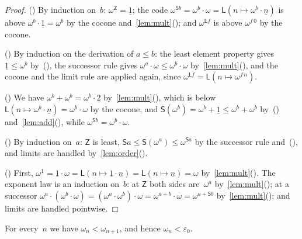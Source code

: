 \documentclass[11pt]{amsart}
\makeatletter
\newcommand{\bZ}{\mathsf{Z}}
\newcommand{\bS}{\mathsf{S}}
\newcommand{\bL}{\mathsf{L}}
\newcommand{\bplus}{\mathbin{+}}
\newcommand{\btimes}{\mathbin{\cdot}}
\newcommand{\num}[1]{\underline{#1}}          %
\newcommand{\eps}{\varepsilon_{0}}
\newcommand{\tower}[1]{\omega_{#1}}           %
\newif\ifagdarefs
\newcommand{\AgdaRefs}[1]{\ifagdarefs{\footnotesize\color{agdablue}(#1)}\else\unskip\fi}
\newcommand{\Agda}[2]{{\footnotesize\color{agdablue}\textsf{#1}%
  \ifblank{#2}{}{\texttt{.}\allowbreak\texttt{#2}}}}
\let\ttt@plain\texttt
\renewcommand{\texttt}[1]{{\footnotesize\color{agdablue}\ttt@plain{#1}}}
\theoremstyle{plain}
\theoremstyle{definition}
\makeatother
\begin{document}
\begin{proof}
() By induction on~$b$: $\omega^{\bZ} = \num 1$;
the code $\omega^{\bS b} = \omega^{b} \btimes \omega
= \bL(n \mapsto \omega^{b} \btimes \num n)$ is above
$\omega^{b} \btimes \num 1 = \omega^{b}$ by the cocone
and~\cref{lem:mult}(); and $\omega^{\bL f}$ is
above $\omega^{f\,0}$ by the cocone.

() By induction on the derivation of
$a \le b$: the least element property gives
$\num 1 \le \omega^{b}$ by~(), the successor
rule gives $\omega^{a} \btimes \omega \le \omega^{b} \btimes \omega$
by~\cref{lem:mult}(), and the cocone and the
limit rule are applied again, since
$\omega^{\bL f} = \bL(n \mapsto \omega^{f\,n})$.

() We have
$\omega^{b} \bplus \omega^{b} = \omega^{b} \btimes \num 2$
by~\cref{lem:mult}(), which is
below $\bL(n \mapsto \omega^{b} \btimes \num n) = \omega^{b} \btimes
\omega$ by the cocone, and
$\bS(\omega^{b}) = \omega^{b} \bplus \num 1 \le
\omega^{b} \bplus \omega^{b}$
by~() and~\cref{lem:add}(),
while $\omega^{\bS b} = \omega^{b} \btimes \omega$.

() By induction on~$a$: $\bZ$ is least,
$\bS a \le \bS(\omega^{a}) \le \omega^{\bS a}$ by the successor rule
and~(), and limits are handled
by~\cref{lem:order}().

() First,
$\omega^{\num 1} = \num 1 \btimes \omega
= \bL(n \mapsto \num 1 \btimes \num n) = \bL(n \mapsto \num n)
= \omega$ by~\cref{lem:mult}(). The exponent
law is an induction on~$b$: at $\bZ$ both sides are~$\omega^{a}$
by~\cref{lem:mult}(); at a successor
$\omega^{a} \btimes (\omega^{b} \btimes \omega)
= (\omega^{a} \btimes \omega^{b}) \btimes \omega
= \omega^{a \bplus b} \btimes \omega = \omega^{a \bplus \bS b}$
by~\cref{lem:mult}(); and limits are handled
pointwise.
\end{proof}

\begin{lemma}
\label{lem:tower}
For every~$n$ we have $\tower n < \tower{n+1}$, and hence
$\tower n < \eps$.
\AgdaRefs{\Agda{BrouwerOrdinals.Epsilon0}{tower-strict};
\texttt{tower-<-ε₀}.}
\end{lemma}
\end{document}
